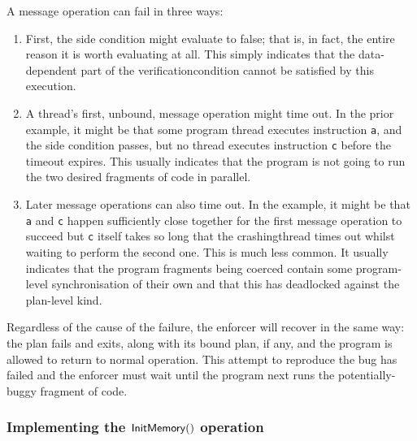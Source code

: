 A message operation can fail in three ways:
\begin{enumerate}
\item
  First, the side condition might evaluate to false; that is, in fact,
  the entire reason it is worth evaluating at all.  This simply
  indicates that the data-dependent part of the
  \gls{verificationcondition} cannot be satisfied by this execution.

\item
  A thread's first, unbound, message operation might time out.  In the
  prior example, it might be that some program thread executes
  instruction \texttt{a}, and the side condition passes, but no thread
  executes instruction \texttt{c} before the timeout expires.  This
  usually indicates that the program is not going to run the two
  desired fragments of code in parallel.

\item
  Later message operations can also time out.  In the example, it
  might be that \texttt{a} and \texttt{c} happen sufficiently close
  together for the first message operation to succeed but \texttt{c}
  itself takes so long that the \gls{crashingthread} times out whilst
  waiting to perform the second one.  This is much less common.  It
  usually indicates that the program fragments being coerced contain
  some program-level synchronisation of their own and that this has
  deadlocked against the plan-level kind.
\end{enumerate}
Regardless of the cause of the failure, the enforcer will recover in
the same way: the plan fails and exits, along with its bound plan, if
any, and the program is allowed to return to normal operation.  This
attempt to reproduce the bug has failed and the enforcer must wait
until the program next runs the potentially-buggy fragment of code.

\subsubsection{Implementing the $\mathsf{InitMemory}()$ operation}

